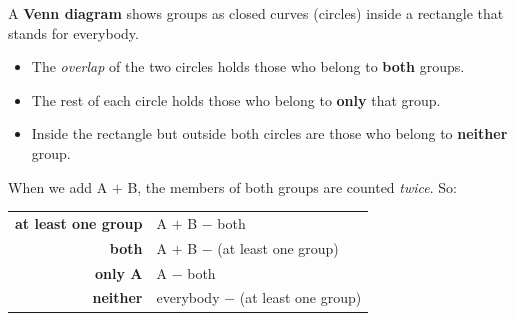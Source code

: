 \documentclass[11pt]{article}
\renewcommand{\arraystretch}{1.35}
\begin{document}
\newcommand{\stpVennIIIx}[2]{%
\begin{tikzpicture}[font=\small]
\fill[tmBlue!30,fill opacity=0.55] (-0.7,0.4) circle (1.15);
\fill[tmOrange!35,fill opacity=0.55] (0.7,0.4) circle (1.15);
\fill[tmGreen!30,fill opacity=0.55] (0,-0.8) circle (1.15);
\draw[line width=0.9pt,tmBlue!80!black] (-0.7,0.4) circle (1.15);
\draw[line width=0.9pt,tmOrange!85!black] (0.7,0.4) circle (1.15);
\draw[line width=0.9pt,tmGreen!70!black] (0,-0.8) circle (1.15);
\draw[line width=0.8pt,Slate,rounded corners=4pt] (-4.0,-2.3) rectangle (4.0,1.85);
\node[font=\footnotesize\bfseries,text=tmBlue!80!black,anchor=east] at (-1.85,1.0) {\stpVa};
\node[font=\footnotesize\bfseries,text=tmOrange!85!black,anchor=west] at (1.85,1.0) {\stpVb};
\node[font=\footnotesize\bfseries,text=tmGreen!60!black,anchor=west] at (1.2,-1.65) {\stpVc};
\node at (-1.25,0.65) {\stpVd}; \node at (1.25,0.65) {\stpVe}; \node at (0,-1.45) {\stpVf};
\node at (0,0.98) {\stpVg}; \node at (-0.72,-0.45) {\stpVh}; \node at (0.72,-0.45) {\stpVi};
\node at (0,0.05) {#1};
\node[anchor=south west,font=\footnotesize] at (-3.9,-2.25) {#2};
\end{tikzpicture}}
\begin{knowbox}
A \textbf{Venn diagram} shows groups as closed curves (circles) inside a rectangle that stands for everybody.
\begin{center}
\end{center}
\begin{itemize}[leftmargin=1.4em,itemsep=3pt]
\item The \emph{overlap} of the two circles holds those who belong to \textbf{both} groups.
\item The rest of each circle holds those who belong to \textbf{only} that group.
\item Inside the rectangle but outside both circles are those who belong to \textbf{neither} group.
\end{itemize}
When we add A $+$ B, the members of both groups are counted \emph{twice}. So:
\begin{center}
\renewcommand{\arraystretch}{1.3}
\begin{tabular}{@{}r@{\ $=$\ }l@{}}
\textbf{at least one group} & A $+$ B $-$ both\\
\textbf{both} & A $+$ B $-$ (at least one group)\\
\textbf{only A} & A $-$ both\\
\textbf{neither} & everybody $-$ (at least one group)\\
\end{tabular}
\end{center}
\end{knowbox}
\end{document}
